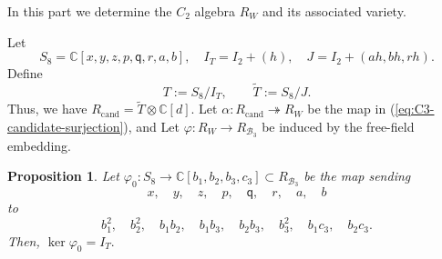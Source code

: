 \documentclass[11pt]{amsart}
\newtheorem{proposition}[theorem]{Proposition}
\theoremstyle{definition}
\theoremstyle{remark}
\newcommand{\B}{\mathcal B}
\begin{document}
In this part we determine the $C_2$ algebra $R_W$ and its associated variety.

Let \[S_8=\mathbb{C}[x,y,z,p,\mathsf q, r, a, b],\quad I_T=I_2+(h),\quad  J=I_2+(ah,bh,rh). \]
Define \[T:=S_8/I_T,\qquad \tilde{T}:=S_8/J.\] 
Thus, we have $R_{\mathrm{ cand}}=\tilde{T}\otimes \mathbb{C}[d]. $
Let $\alpha: R_{\mathrm{cand}}\twoheadrightarrow  R_W$ be the map in (\ref{eq:C3-candidate-surjection}), and Let $\varphi: R_{W}\rightarrow R_{\B_3}$ be induced by the free-field embedding. 
\begin{proposition}\label{prop:I_T}
Let $\varphi_0: S_8\rightarrow \mathbb{C}[b_1,b_2,b_3,c_3]\subset R_{\B_3}$ be the map sending 
\[
x,\quad y,\quad z,\quad p,\quad
\mathsf{q},\quad r,\quad a,\quad b
\]
to
\[
b_1^2,\quad b_2^2,\quad b_1b_2,\quad b_1b_3,\quad
b_2b_3,\quad b_3^2,\quad b_1c_3,\quad b_2c_3.
\] 
Then, $\ker\varphi_0=I_T. $
\end{proposition}
\end{document}
